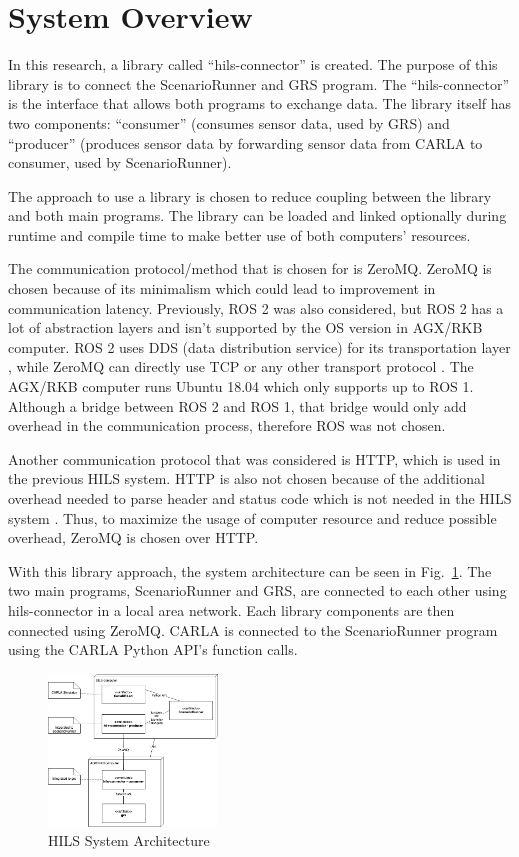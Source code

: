 \section{System Overview}

In this research, a library called ``hils-connector'' is created. The purpose of
this library is to connect the ScenarioRunner and GRS program. The
``hils-connector'' is the interface that allows both programs to exchange data.
The library itself has two components: ``consumer'' (consumes sensor data, used
by GRS) and ``producer'' (produces sensor data by forwarding sensor data from
CARLA to consumer, used by ScenarioRunner).

The approach to use a library is chosen to reduce coupling between the library
and both main programs. The library can be loaded and linked optionally during
runtime and compile time to make better use of both computers' resources.

The communication protocol/method that is chosen for is ZeroMQ. ZeroMQ is chosen
because of its minimalism which could lead to improvement in communication
latency. Previously, ROS 2 was also considered, but ROS 2 has a lot of
abstraction layers and isn't supported by the OS version in AGX/RKB computer.
ROS 2 uses DDS (data distribution service) for its transportation layer
\cite{doi:10.1126/scirobotics.abm6074_ros}, while ZeroMQ can directly use TCP or
any other transport protocol \cite{hurton_zmtp}.  The AGX/RKB computer runs
Ubuntu 18.04 which only supports up to ROS 1. Although a bridge between ROS 2
and ROS 1, that bridge would only add overhead in the communication process,
therefore ROS was not chosen.

Another communication protocol that was considered is HTTP, which is used in the
previous HILS system. HTTP is also not chosen because of the additional overhead
needed to parse header and status code which is not needed in the HILS system
\cite{rfc9110}. Thus, to maximize the usage of computer resource and reduce
possible overhead, ZeroMQ is chosen over HTTP.

With this library approach, the system architecture can be seen in
Fig.~\ref{section-4-hils-deployment-diagram}. The two main programs,
ScenarioRunner and GRS, are connected to each other using hils-connector in a
local area network. Each library components are then connected using ZeroMQ.
CARLA is connected to the ScenarioRunner program using the CARLA Python API's
function calls.

\begin{figure}[htbp]
	\centerline{\includegraphics[width=0.4\textwidth]{resources/chapter-3/deployment-diagram-new-hils-EN.png}}
	\caption{HILS System Architecture}
	\label{section-4-hils-deployment-diagram}
\end{figure}

